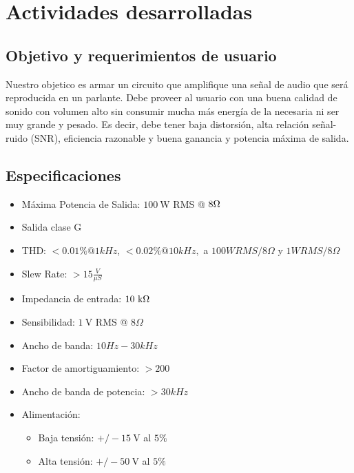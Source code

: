 \documentclass[a4paper,12pt,twoside]{article}
\newcommand{\volt}{\ensuremath{~\mathrm{V}}}
\newcommand{\kohm}{\ensuremath{~\mathrm{k}\ohm}}
\newcommand{\watt}{\ensuremath{~\mathrm{W}}}
\begin{document}


\newpage
\vfill
\tableofcontents
\vfill


\newpage

\section{Actividades desarrolladas}

\subsection{Objetivo y requerimientos de usuario}

Nuestro objetico es armar un circuito que amplifique una señal de audio que será reproducida en un parlante.  Debe proveer al usuario con una buena calidad de sonido con volumen alto sin consumir mucha más energía de la necesaria ni ser muy grande y pesado. Es decir, debe tener baja distorsión, alta relación señal-ruido (SNR), eficiencia razonable y buena ganancia y potencia máxima de salida.



\subsection{Especificaciones}

\bigskip

\begin{itemize}
	\item Máxima Potencia de Salida:  $100\watt$ RMS @ $8\ohm$
	\item Salida clase G
	\item THD: $< 0.01 \% @ 1kHz$, $<0.02 \% @ 10kHz,$ a $100W RMS/8\Omega$ y $1W RMS/8\Omega$
	\item Slew Rate: $>15\frac{V}{\mu S}$
	\item Impedancia de entrada: $10\kohm$
	\item Sensibilidad: $1\volt$ RMS @ $8\Omega$
	\item Ancho de banda: $10 Hz-30kHz$
	\item Factor de amortiguamiento: $>200$
	\item Ancho de banda de potencia: $>30kHz$
	\item Alimentación: 
	\begin{itemize}
		\item Baja tensión: $ +/-15\volt$ al $5\%$
		\item Alta tensión: $ +/-50\volt$ al $5\%$
	\end{itemize}
\end{itemize}
\end{document}
